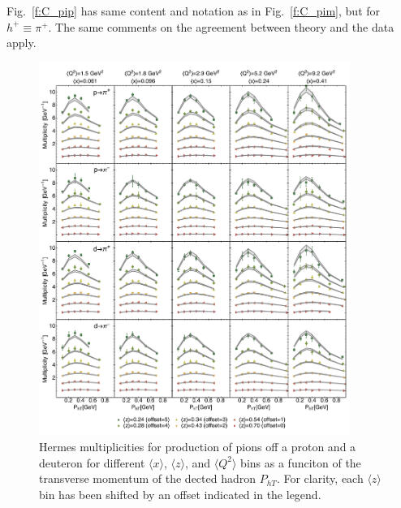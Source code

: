 \documentclass[aps,preprintnumbers,showpacs,nofootinbib,superscriptaddress,floatfix]{revtex4}
\newcommand{\AS}[1]{{\textcolor[rgb]{1,0,1}{#1}}}
\begin{document}
Fig.~\ref{f:C_pip} has same content and notation as in Fig.~\ref{f:C_pim}, \AS{but for $h^+ \equiv \pi^+$. The} same comments on the agreement between theory and the data apply.
\begin{figure}[h!]
\begin{center}
\includegraphics[width=0.90\textwidth]{plots/Hermes_Pions_SCIplot_flINDEP.pdf}
\end{center}
\caption{Hermes multiplicities for production of pions off a proton and a deuteron for different $\langle x \rangle$, $\langle z \rangle$, and $\langle Q^2 \rangle$ bins as a funciton of the transverse momentum of the dected hadron  $P_{hT}$. \AS{For clarity, each $\langle z \rangle$  bin has been shifted by an offset indicated in the legend.}} 
\label{f:H_pions}
\end{figure}
\end{document}
